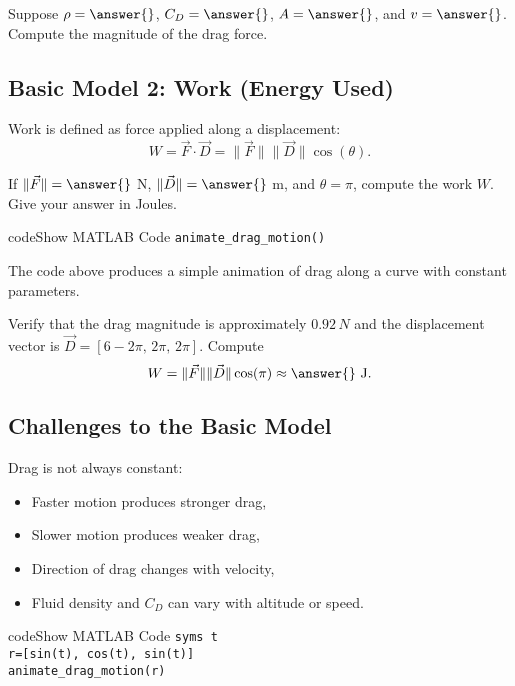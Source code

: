 \documentclass{ximera}
\begin{document}
\begin{problem}
Suppose $\rho = \answer{}$, $C_D = \answer{}$, $A = \answer{}$, and $v = \answer{}$.  
Compute the magnitude of the drag force.
\end{problem}

\subsection*{Basic Model 2: Work (Energy Used)}

Work is defined as force applied along a displacement:
\[
W = \vec{F}\cdot\vec{D} = \|\vec{F}\|\|\vec{D}\|\cos(\theta).
\]

\begin{problem}
If $\|\vec{F}\| = \answer{}$ N, $\|\vec{D}\| = \answer{}$ m, and $\theta = \pi$, compute the work $W$.  
Give your answer in Joules.
\end{problem}

\begin{expandable}{code}{Show MATLAB Code}
\texttt{animate\_drag\_motion()}
\end{expandable}

The code above produces a simple animation of drag along a curve with constant parameters.

\begin{problem}
Verify that the drag magnitude is approximately $0.92\,N$ and the displacement vector is 
$\vec{D} = [6-2\pi,\, 2\pi,\, 2\pi]$.  
Compute
\[
W = \|\vec{F}\|\|\vec{D}\|\cos(\pi) \approx \answer{} \ \text{J}.
\]
\end{problem}

\subsection*{Challenges to the Basic Model}

Drag is not always constant:
\begin{itemize}
\item Faster motion produces stronger drag,
\item Slower motion produces weaker drag,
\item Direction of drag changes with velocity,
\item Fluid density and $C_D$ can vary with altitude or speed.
\end{itemize}

\begin{expandable}{code}{Show MATLAB Code}
\texttt{syms t}\\
\texttt{r=[sin(t), cos(t), sin(t)]}\\
\texttt{animate\_drag\_motion(r)}
\end{expandable}
\end{document}
